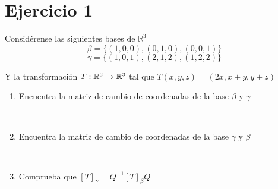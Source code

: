 \section*{Ejercicio 1}

\noindent Considérense las siguientes bases de $\mathbb{R}^{3}$
\begin{equation*}
    \beta = \{ (1,0,0),(0,1,0),(0,0,1) \}
\end{equation*}
\begin{equation*}
    \gamma = \{ (1,0,1),(2,1,2),(1,2,2) \}
\end{equation*}

\noindent Y la transformación $T: \mathbb{R}^{3} \rightarrow \mathbb{R}^{3}$ tal que $T(x,y,z) = (2x,x+y,y+z)$ 
\begin{enumerate}
    \item Encuentra la matriz de cambio de coordenadas de la base $\beta$ y $\gamma$
    
    \noindent \solucion \\

    \item Encuentra la matriz de cambio de coordenadas de la base $\gamma$ y $\beta$ 
    
    \noindent \solucion \\

    \item Comprueba que $\left[ T \right]_{\gamma} = Q^{-1} \left[ T \right]_{\beta} Q$ 
    
    \noindent \solucion \\
\end{enumerate}

